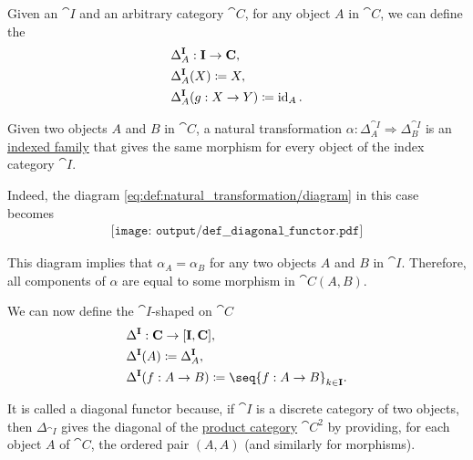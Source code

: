 \begin{definition}\label{def:diagonal_functor}
  Given an  \( \cat{I} \) and an arbitrary category \( \cat{C} \), for any object \( A \) in \( \cat{C} \), we can define the 
  \begin{equation*}
    \begin{aligned}
      &\Delta_A^{\operatorname{\mathbf{I}}}: \operatorname{\mathbf{I}} \to \operatorname{\mathbf{C}}, \\
      &\Delta_A^{\operatorname{\mathbf{I}}}(X) \coloneqq X, \\
      &\Delta_A^{\operatorname{\mathbf{I}}}(g: X \to Y) \coloneqq \operatorname{id}_A.
    \end{aligned}
  \end{equation*}

  Given two objects \( A \) and \( B \) in \( \cat{C} \), a natural transformation \( \alpha: \Delta_A^{\cat{I}} \Rightarrow \Delta_B^{\cat{I}} \) is an \hyperref[def:cartesian_product/indexed_family]{indexed family} that gives the same morphism for every object of the index category \( \cat{I} \).

  Indeed, the diagram \eqref{eq:def:natural_transformation/diagram} in this case becomes
  \begin{equation}\label{eq:def:diagonal_functor/nat}
    \begin{aligned}
      \texttt{[image: output/def\_\_diagonal\_functor.pdf]}
    \end{aligned}
  \end{equation}

  This diagram implies that \( \alpha_A = \alpha_B \) for any two objects \( A \) and \( B \) in \( \cat{I} \). Therefore, all components of \( \alpha \) are equal to some morphism in \( \cat{C}(A, B) \).

  We can now define the \( \cat{I} \)-shaped  on \( \cat{C} \)
  \begin{equation*}
    \begin{aligned}
      &\Delta^{\cat{I}}: \cat{C} \to [\cat{I}, \cat{C}], \\
      &\Delta^{\cat{I}}(A) \coloneqq \Delta_A^{\cat{I}}, \\
      &\Delta^{\cat{I}}(f: A \to B) \coloneqq \seq{ f: A \to B }_{k \in \cat{I}}.
    \end{aligned}
  \end{equation*}

  It is called a diagonal functor because, if \( \cat{I} \) is a discrete category of two objects, then \( \Delta_{\cat{I}} \) gives the diagonal of the \hyperref[def:product_category]{product category} \( \cat{C}^2 \) by providing, for each object \( A \) of \( \cat{C} \), the ordered pair \( (A, A) \) (and similarly for morphisms).
\end{definition}

